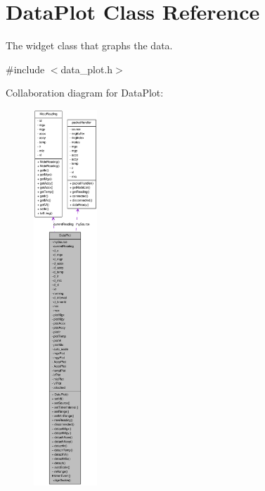 \hypertarget{classDataPlot}{
\section{DataPlot Class Reference}
\label{classDataPlot}
}


The widget class that graphs the data.  




{\ttfamily \#include $<$data\_\-plot.h$>$}



Collaboration diagram for DataPlot:\nopagebreak
\begin{figure}[H]
\begin{center}
\leavevmode
\includegraphics[height=400pt]{classDataPlot__coll__graph}
\end{center}
\end{figure}

